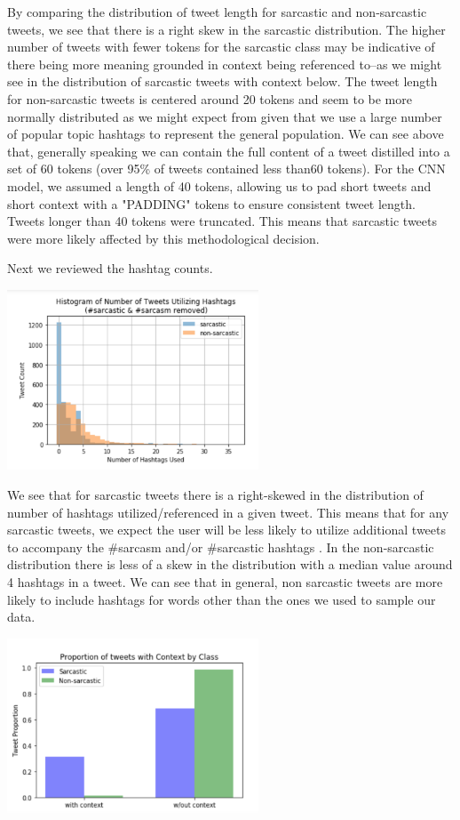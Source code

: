 \documentclass[11pt,a4paper]{article}
\begin{document}
By comparing the distribution of tweet length for sarcastic and non-sarcastic tweets, we see that there is a right skew in the sarcastic distribution. The higher number of tweets with fewer tokens for the sarcastic class may be indicative of there being more meaning grounded in context being referenced to--as we might see in the distribution of sarcastic tweets with context below. The tweet length for non-sarcastic tweets is centered around 20 tokens and seem to be more normally distributed as we might expect from given that we use a large number of popular topic hashtags to represent the general population. We can see above that, generally speaking we can contain the full content of a tweet distilled into a set of 60 tokens (over 95\% of tweets contained less than60 tokens). For the CNN model, we assumed a length of 40 tokens, allowing us to pad short tweets and short context with a "PADDING" tokens to ensure consistent tweet length. Tweets longer than 40 tokens were truncated. This means that sarcastic tweets were more likely affected by this methodological decision.

Next we reviewed the hashtag counts. 

\includegraphics[width=75mm,scale=0.5]{hashtag_histogram.png}

We see that for sarcastic tweets there is a right-skewed in the distribution of number of hashtags utilized/referenced in a given tweet. This means that for any sarcastic tweets, we expect the user will be less likely to utilize additional tweets to accompany the \#sarcasm and/or \#sarcastic hashtags . In the non-sarcastic distribution there is less of a skew in the distribution with a median value around 4 hashtags in a tweet. We can see that in general, non sarcastic tweets are more likely to include hashtags for words other than the ones we used to sample our data. 

\includegraphics[width=75mm,scale=0.5]{context_proportion.png}
\end{document}
